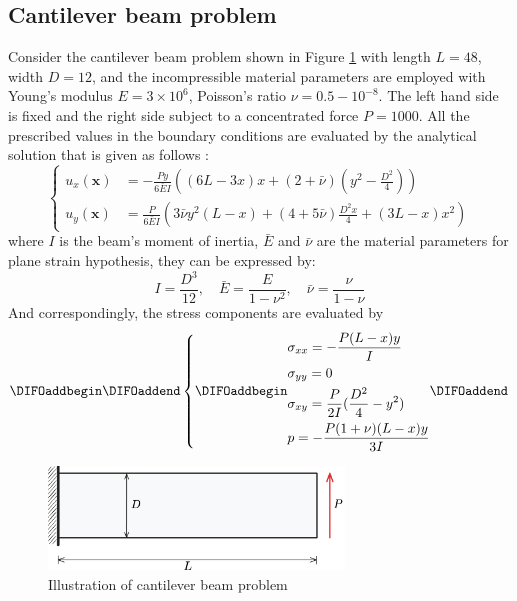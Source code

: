 \subsection{Cantilever beam problem}\label{sec:cantilever}
Consider the cantilever beam problem shown in Figure \ref{fg:cantilever_model} with length $L = 48$, width $D = 12$, and the incompressible material parameters are employed with Young's modulus $E = 3\times 10^6$, Poisson's ratio $\nu = 0.5-10^{-8}$. The left hand side is fixed and the right side subject to a concentrated force $P = 1000$. All the prescribed values in the boundary conditions are evaluated by the analytical solution that is given as follows \cite{timoshenko1969}:
\begin{equation}
\left\{
\begin{aligned}
u_x(\boldsymbol{x}) &= - \frac{Py}{6\bar{E}I} \left( (6L - 3x)x + (2 + \bar{\nu})(y^2 - \frac{D^2}{4}) \right) \\
u_y(\boldsymbol{x}) &= \frac{P}{6\bar{E}I} \left( 3 \bar{\nu} y^2(L-x) + (4+5\bar{\nu}) \frac{D^2x}{4} + (3L-x)x^2 \right)
\end{aligned}
\right.
\end{equation}
where $I$ is the beam's moment of inertia, $\bar{E}$ and $\bar{\nu}$ are the material parameters for plane strain hypothesis, they can be expressed by:
\begin{equation}
I = \frac{D^3}{12}, \quad \bar{E} = \frac{E}{1-\nu^2}, \quad \bar{\nu} = \frac{\nu}{1-\nu}
\end{equation}
And correspondingly, the stress components \DIFaddbegin {}\DIFaddend are evaluated by
\begin{equation}\DIFaddbegin \label{cantilever_stress}
\DIFaddend \left\{
 \DIFaddbegin \begin{aligned}
&\sigma_{xx} = - \frac{P(L-x)y}{I} \\
&\sigma_{yy} = 0 \\
&\sigma_{xy} = \frac{P}{2I}(\frac{D^2}{4}-y^2) \\
&p = - \frac{P(1+\nu)(L-x)y}{3I}
\end{aligned}\DIFaddend 
\right.
\end{equation}

\begin{figure}[H]
\centering
\includegraphics[width=0.7\textwidth]{png/cantilever_model.png}
\caption{Illustration of cantilever beam problem}\label{fg:cantilever_model}
\end{figure}

